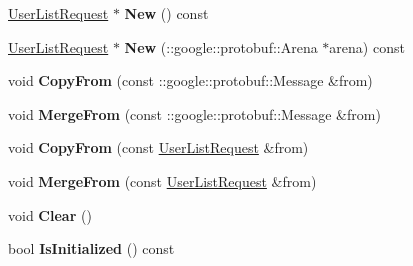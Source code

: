 \begin{DoxyCompactItemize}
\item 
\hypertarget{classSimpleChat_1_1UserListRequest_a7a1c940050451424a13ced56a5a25528}{\hyperlink{classSimpleChat_1_1UserListRequest}{User\-List\-Request} $\ast$ {\bfseries New} () const }\label{classSimpleChat_1_1UserListRequest_a7a1c940050451424a13ced56a5a25528}

\item 
\hypertarget{classSimpleChat_1_1UserListRequest_a68b46b687074a254fc37acf6049527b1}{\hyperlink{classSimpleChat_1_1UserListRequest}{User\-List\-Request} $\ast$ {\bfseries New} (\-::google\-::protobuf\-::\-Arena $\ast$arena) const }\label{classSimpleChat_1_1UserListRequest_a68b46b687074a254fc37acf6049527b1}

\item 
\hypertarget{classSimpleChat_1_1UserListRequest_a0b9f4fd9c2b1681d503e73ab4520b338}{void {\bfseries Copy\-From} (const \-::google\-::protobuf\-::\-Message \&from)}\label{classSimpleChat_1_1UserListRequest_a0b9f4fd9c2b1681d503e73ab4520b338}

\item 
\hypertarget{classSimpleChat_1_1UserListRequest_a0b16ebd3e4c4d309c36601e874ce096b}{void {\bfseries Merge\-From} (const \-::google\-::protobuf\-::\-Message \&from)}\label{classSimpleChat_1_1UserListRequest_a0b16ebd3e4c4d309c36601e874ce096b}

\item 
\hypertarget{classSimpleChat_1_1UserListRequest_ab7727ed54ac9484bb37c2ed6183daf92}{void {\bfseries Copy\-From} (const \hyperlink{classSimpleChat_1_1UserListRequest}{User\-List\-Request} \&from)}\label{classSimpleChat_1_1UserListRequest_ab7727ed54ac9484bb37c2ed6183daf92}

\item 
\hypertarget{classSimpleChat_1_1UserListRequest_aff4c8bebd90862effd88416b5403e54d}{void {\bfseries Merge\-From} (const \hyperlink{classSimpleChat_1_1UserListRequest}{User\-List\-Request} \&from)}\label{classSimpleChat_1_1UserListRequest_aff4c8bebd90862effd88416b5403e54d}

\item 
\hypertarget{classSimpleChat_1_1UserListRequest_af48c6b644eb5e6a37125a1a87288ef95}{void {\bfseries Clear} ()}\label{classSimpleChat_1_1UserListRequest_af48c6b644eb5e6a37125a1a87288ef95}

\item 
\hypertarget{classSimpleChat_1_1UserListRequest_ac0833eb07d6b4e7d9f9f938a2623d27c}{bool {\bfseries Is\-Initialized} () const }\label{classSimpleChat_1_1UserListRequest_ac0833eb07d6b4e7d9f9f938a2623d27c}


\end{DoxyCompactItemize}
